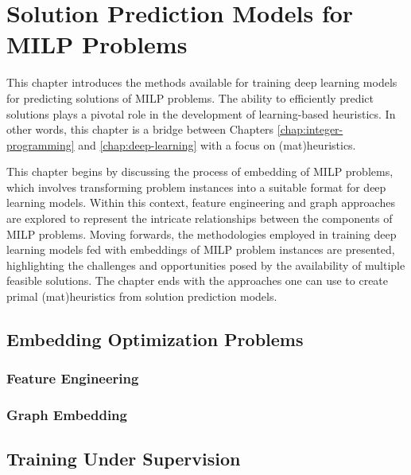 

\chapter{Solution Prediction Models for MILP Problems}\label{chap:solution-prediction}


This chapter introduces the methods available for training deep learning models for predicting solutions of MILP problems.
The ability to efficiently predict solutions plays a pivotal role in the development of learning-based heuristics.
In other words, this chapter is a bridge between Chapters \ref{chap:integer-programming} and \ref{chap:deep-learning} with a focus on (mat)heuristics.

This chapter begins by discussing the process of embedding of MILP problems, which involves transforming problem instances into a suitable format for deep learning models.
Within this context, feature engineering and graph approaches are explored to represent the intricate relationships between the components of MILP problems.
Moving forwards, the methodologies employed in training deep learning models fed with embeddings of MILP problem instances are presented, highlighting the challenges and opportunities posed by the availability of multiple feasible solutions.
The chapter ends with the approaches one can use to create primal (mat)heuristics from solution prediction models.


\section{Embedding Optimization Problems}


\subsection{Feature Engineering}

\subsection{Graph Embedding}

\section{Training Under Supervision}

